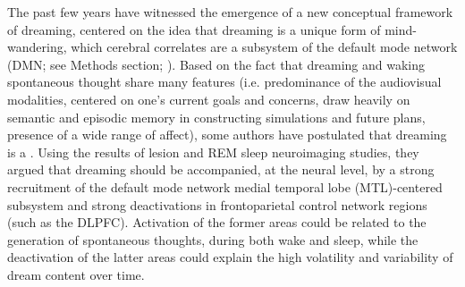 The past few years have witnessed the emergence of a new conceptual framework of dreaming, centered on the idea that dreaming is a unique form of mind-wandering, which cerebral correlates are a subsystem of the default mode network (DMN; see Methods section; \citealp{maquet_human_2005, domhoff_neural_2011, domhoff_dreaming_2015, christoff_mind-wandering_2016}). Based on the fact that dreaming and waking spontaneous thought share many features (i.e. predominance of the audiovisual modalities, centered on one’s current goals and concerns, draw heavily on semantic and episodic memory in constructing simulations and future plans, presence of a wide range of affect), some authors have postulated that dreaming is a  \citep{christoff_mind-wandering_2016}. Using the results of lesion and REM sleep neuroimaging studies, they argued that dreaming should be accompanied, at the neural level, by a strong recruitment of the default mode network medial temporal lobe (MTL)-centered subsystem and strong deactivations in frontoparietal control network regions (such as the DLPFC). Activation of the former areas could be related to the generation of spontaneous thoughts, during both wake and sleep, while the deactivation of the latter areas could explain the high volatility and variability of dream content over time.
